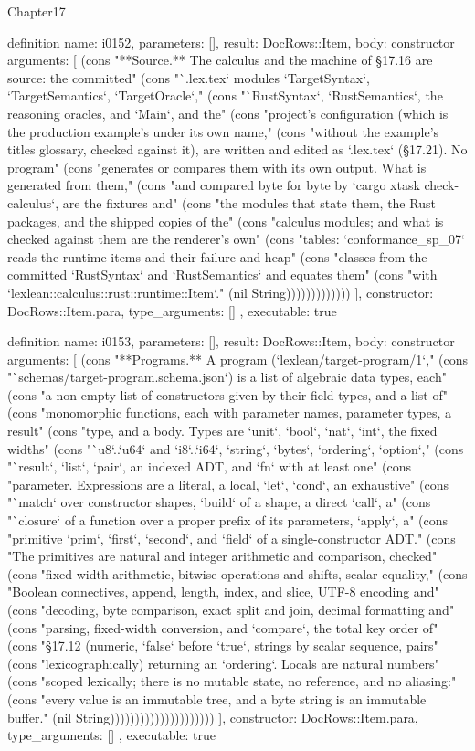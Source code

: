 \begin{lexlean}{Chapter17}
\begin{semanticmodule}
definition{
  name: i0152,
  parameters: [],
  result: DocRows::Item,
  body: constructor{
    arguments: [
      (cons "**Source.** The calculus and the machine of §17.16 are source: the committed" (cons "`.lex.tex` modules `TargetSyntax`, `TargetSemantics`, `TargetOracle`," (cons "`RustSyntax`, `RustSemantics`, the reasoning oracles, and `Main`, and the" (cons "project's configuration (which is the production example's under its own name," (cons "without the example's titles glossary, checked against it), are written and edited as `.lex.tex` (§17.21). No program" (cons "generates or compares them with its own output. What is generated from them," (cons "and compared byte for byte by `cargo xtask check-calculus`, are the fixtures and" (cons "the modules that state them, the Rust packages, and the shipped copies of the" (cons "calculus modules; and what is checked against them are the renderer's own" (cons "tables: `conformance_sp_07` reads the runtime items and their failure and heap" (cons "classes from the committed `RustSyntax` and `RustSemantics` and equates them" (cons "with `lexlean::calculus::rust::runtime::Item`." (nil String)))))))))))))
    ],
    constructor: DocRows::Item.para,
    type_arguments: []
  },
  executable: true
}

definition{
  name: i0153,
  parameters: [],
  result: DocRows::Item,
  body: constructor{
    arguments: [
      (cons "**Programs.** A program (`lexlean/target-program/1`," (cons "`schemas/target-program.schema.json`) is a list of algebraic data types, each" (cons "a non-empty list of constructors given by their field types, and a list of" (cons "monomorphic functions, each with parameter names, parameter types, a result" (cons "type, and a body. Types are `unit`, `bool`, `nat`, `int`, the fixed widths" (cons "`u8`..`u64` and `i8`..`i64`, `string`, `bytes`, `ordering`, `option`," (cons "`result`, `list`, `pair`, an indexed ADT, and `fn` with at least one" (cons "parameter. Expressions are a literal, a local, `let`, `cond`, an exhaustive" (cons "`match` over constructor shapes, `build` of a shape, a direct `call`, a" (cons "`closure` of a function over a proper prefix of its parameters, `apply`, a" (cons "primitive `prim`, `first`, `second`, and `field` of a single-constructor ADT." (cons "The primitives are natural and integer arithmetic and comparison, checked" (cons "fixed-width arithmetic, bitwise operations and shifts, scalar equality," (cons "Boolean connectives, append, length, index, and slice, UTF-8 encoding and" (cons "decoding, byte comparison, exact split and join, decimal formatting and" (cons "parsing, fixed-width conversion, and `compare`, the total key order of" (cons "§17.12 (numeric, `false` before `true`, strings by scalar sequence, pairs" (cons "lexicographically) returning an `ordering`. Locals are natural numbers" (cons "scoped lexically; there is no mutable state, no reference, and no aliasing:" (cons "every value is an immutable tree, and a byte string is an immutable buffer." (nil String)))))))))))))))))))))
    ],
    constructor: DocRows::Item.para,
    type_arguments: []
  },
  executable: true
}


\end{semanticmodule}
\end{lexlean}
